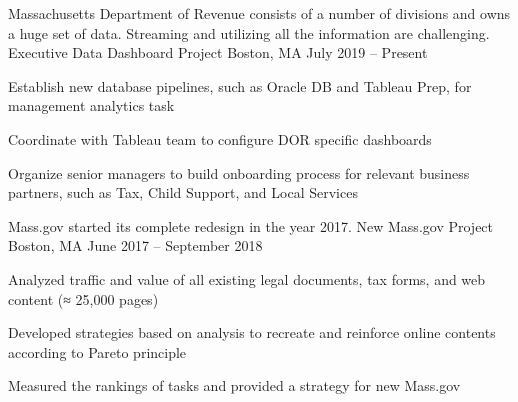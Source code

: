 

\begin{cvprojects}

  \cvproject
    {Massachusetts Department of Revenue consists of a number of divisions and owns a huge set of data. Streaming and utilizing all the information are challenging.} %
    {Executive Data Dashboard Project} %
    {Boston, MA} %
    {July 2019 – Present} %
    {
      \begin{cvitems} %
        \item {Establish new database pipelines, such as Oracle DB and Tableau Prep, for management analytics task}
        \item {Coordinate with Tableau team to configure DOR specific dashboards}
        \item {Organize senior managers to build onboarding process for relevant business partners, such as Tax, Child Support, and Local Services}
      \end{cvitems}
    }
    
  \cvproject
    {Mass.gov started its complete redesign in the year 2017.} %
    {New Mass.gov Project} %
    {Boston, MA} %
    {June 2017 – September 2018} %
    {
      \begin{cvitems} %
        \item {Analyzed traffic and value of all existing legal documents, tax forms, and web content (≈ 25,000 pages)}
        \item {Developed strategies based on analysis to recreate and reinforce online contents according to Pareto principle}
        \item {Measured the rankings of tasks and provided a strategy for new Mass.gov}
      \end{cvitems}
    }


\end{cvprojects}

